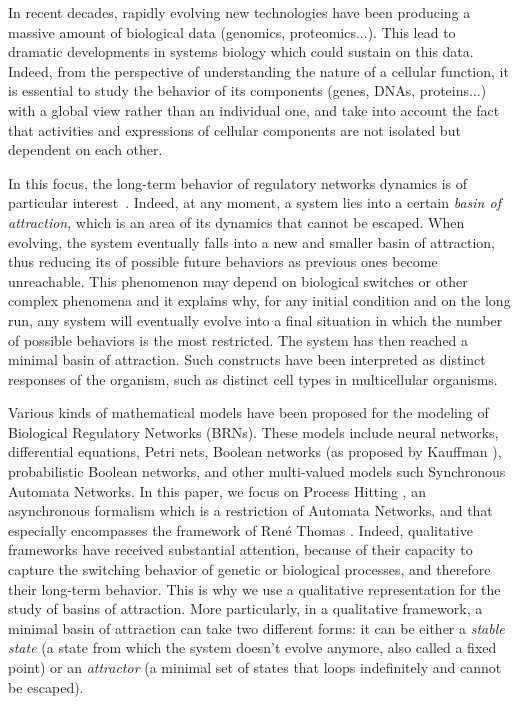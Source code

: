 

In recent decades, rapidly evolving new technologies have been producing a massive amount of biological data (genomics, proteomics...). This lead to dramatic developments in systems biology which could sustain on this data. Indeed, from the perspective of understanding the nature of a cellular function, it is essential to study the behavior of its components (genes, DNAs, proteins...) with a global view rather than an individual one, and take into account the fact that activities and expressions of cellular components are not isolated but dependent on each other.

In this focus, the long-term behavior of regulatory networks dynamics is of particular interest~\cite{wuensche1998genomic}.
Indeed, at any moment, a system lies into a certain \emph{basin of attraction}, which is an area of its dynamics that cannot be escaped.
When evolving, the system eventually falls into a new and smaller basin of attraction, thus reducing its of possible future behaviors as previous ones become unreachable.
This phenomenon may depend on biological switches or other complex phenomena
and it explains why, for any initial condition and on the long run, any system will eventually evolve into a final situation in which the number of possible behaviors is the most restricted. 
The system has then reached a minimal basin of attraction.
Such constructs have been interpreted as distinct responses of the organism, such as distinct cell types in multicellular organisms. 

Various kinds of mathematical models have been proposed for the modeling of Biological Regulatory Networks (BRNs). These models include neural networks, differential equations, Petri nets, Boolean networks (as proposed by Kauffman ), probabilistic Boolean networks, and other multi-valued models such Synchronous Automata Networks. In this paper, we focus on Process Hitting , an asynchronous formalism which is a restriction of Automata Networks, and that especially encompasses the framework of René Thomas . Indeed, qualitative frameworks have received substantial attention, because of their capacity to capture the switching behavior of genetic or biological processes, and therefore their long-term behavior. This is why we use a qualitative representation for the study of basins of attraction.
More particularly, in a qualitative framework, a minimal basin of attraction can take two different forms: it can be either a \emph{stable state} (a state from which the system doesn't evolve anymore, also called a fixed point) or an \emph{attractor} (a minimal set of states that loops indefinitely and cannot be escaped).

